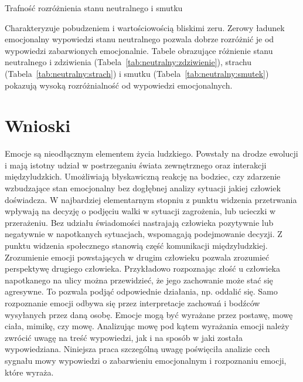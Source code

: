 \documentclass[a4paper,12pt,twoside,openany]{report}
\newcommand{\Tab}[1]{(Tabela~\ref{#1})}
\begin{document}
\begin{table}[hc!]
	\caption{Trafność rozróżnienia stanu neutralnego i smutku}
	\centering
	
	\label{tab:neutralny:smutek}
\end{table}
Charakteryzuje pobudzeniem i wartościowością bliskimi zeru.
Zerowy ładunek emocjonalny wypowiedzi stanu neutralnego pozwala dobrze rozróżnić je od wypowiedzi zabarwionych emocjonalnie. 
Tabele obrazujące różnienie stanu neutralnego i zdziwienia \Tab{tab:neutralny:zdziwienie}, strachu \Tab{tab:neutralny:strach} i smutku \Tab{tab:neutralny:smutek}
pokazują wysoką rozróżnialność od wypowiedzi emocjonalnych. 
%	
%	
\chapter{Wnioski}
Emocje są nieodłącznym elementem życia ludzkiego. 
Powstały na drodze ewolucji i mają istotny udział w postrzeganiu świata zewnętrznego oraz interakcji międzyludzkich.
Umożliwiają błyskawiczną reakcję na bodziec, czy zdarzenie wzbudzające stan emocjonalny bez dogłębnej analizy sytuacji jakiej człowiek doświadcza.
W najbardziej elementarnym stopniu z punktu widzenia przetrwania wpływają na decyzję o podjęciu walki w sytuacji zagrożenia, lub ucieczki w przerażeniu.
Bez udziału świadomości nastrajają człowieka pozytywnie lub negatywnie w napotkanych sytuacjach, wspomagają podejmowanie decyzji.
Z punktu widzenia społecznego stanowią część komunikacji międzyludzkiej.
Zrozumienie emocji powstających w drugim człowieku pozwala zrozumieć perspektywę drugiego człowieka.
Przykładowo rozpoznając złość u człowieka napotkanego na ulicy można przewidzieć, że jego zachowanie może stać się agresywne.
To pozwala podjąć odpowiednie działania, np. oddalić się.
Samo rozpoznanie emocji odbywa się przez interpretacje zachowań i bodźców wysyłanych przez daną osobę.
Emocje mogą być wyrażane przez postawę, mowę ciała, mimikę, czy mowę.
Analizując mowę pod kątem wyrażania emocji należy zwrócić uwagę na treść wypowiedzi, jak i na sposób w jaki została wypowiedziana.
Niniejsza praca szczególną uwagę poświęciła analizie cech sygnału mowy wypowiedzi o zabarwieniu emocjonalnym i rozpoznaniu emocji, które wyraża.
\end{document}
